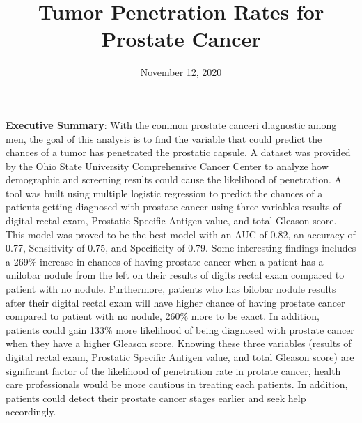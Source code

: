 \documentclass[11pt]{article}\usepackage[]{graphicx}\usepackage[]{color}
\title{Tumor Penetration Rates for Prostate Cancer\vspace{-5ex}}
\date{November 12, 2020\vspace{-5ex}}
\begin{document}
 
\maketitle
\hfill \break


















\noindent\textbf{\underline{Executive Summary}}: With the common prostate canceri diagnostic among men, the goal of this analysis is to find the variable that could predict the chances of a tumor has penetrated the prostatic capsule. A dataset was provided by the Ohio State University Comprehensive Cancer Center to analyze how demographic and screening results could cause the likelihood of penetration. A tool was built using multiple logistic regression to predict the chances of a patients getting diagnosed with prostate cancer using three variables results of digital rectal exam, Prostatic Specific Antigen value, and total Gleason score. This model was proved to be the best model with an AUC of 0.82, an accuracy of 0.77, Sensitivity of 0.75, and Specificity of 0.79. Some interesting findings includes a 269\% increase in chances of having prostate cancer when a patient has a unilobar nodule from the left on their results of digits rectal exam compared to patient with no nodule. Furthermore, patients who has bilobar nodule results after their digital rectal exam will have higher chance of having prostate cancer compared to patient with no nodule, 260\% more to be exact. In addition, patients could gain 133\% more likelihood of being diagnosed with prostate cancer when they have a higher Gleason score. Knowing these three variables (results of digital rectal exam, Prostatic Specific Antigen value, and total Gleason score) are significant factor of the likelihood of penetration rate in protate cancer, health care professionals would be more cautious in treating each patients. In addition, patients could detect their prostate cancer stages earlier and seek help accordingly.      
\hfill \break
\end{document}

